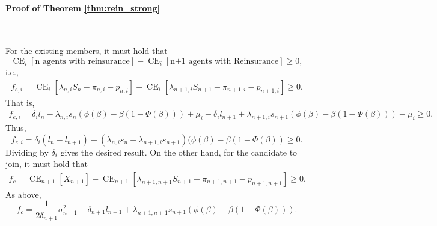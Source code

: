 \documentclass[fleqn,mnsc,nonblindrev]{informs4}
\newcommand{\CE}{\operatorname{CE}}
\newcommand{\macom}[1]{{\color{purple}[#1]}}
\newcommand{\skcom}[1]{{\color{darkpastelgreen}[#1]}}
\begin{document}


\paragraph{Proof of Theorem \ref{thm:rein_strong}}
\

For the existing members, it must hold that
\[
\CE_i[\textrm{n agents with reinsurance}]-\CE_i[\textrm{n+1 agents with Reinsurance}]\geq0,
\]
i.e.,
\begin{gather*}
f_{e,i}=\CE_i\left[\lambda_{n,i}\overline{S}_{n}-\pi_{n,i}-p_{n,i}\right]-\CE_i\left[\lambda_{n+1,i}\overline{S}_{n+1}-\pi_{n+1,i}-p_{n+1,i}\right]\geq0.
\end{gather*}
That is,
\begin{align*}
f_{e,i}=\delta_i l_{n}-\lambda_{n,i}s_n\left(\phi(\beta)-\beta(1-\Phi(\beta))\right)+\mu_i-\delta_i l_{n+1}+\lambda_{n+1,i}s_{n+1}\left(\phi(\beta)-\beta(1-\Phi(\beta))\right)-\mu_i\geq 0.
\end{align*}
Thus,
\[
f_{e,i}=\delta_{i}(l_{n}-l_{n+1})-(\lambda_{n,i}s_n-\lambda_{n+1,i}s_{n+1})(\phi(\beta)-\beta(1-\Phi(\beta))\geq0.
\]
Dividing by $\delta_{i}$ gives the desired result. On the other hand, for the candidate to join, it must hold that
\begin{gather*}
f_{c}=\CE_{n+1}\left[X_{n+1}\right]-\CE_{n+1}\left[\lambda_{n+1,n+1}\overline{S}_{n+1}-\pi_{n+1,n+1}-p_{n+1,n+1}\right]\geq0.
\end{gather*}
As above,
\[
f_{c}=\frac{1}{2\delta_{n+1}}\sigma_{n+1}^2-\delta_{n+1} l_{n+1}+\lambda_{n+1,n+1}s_{n+1}\left(\phi(\beta)-\beta(1-\Phi(\beta))\right).
\]
\end{document}
